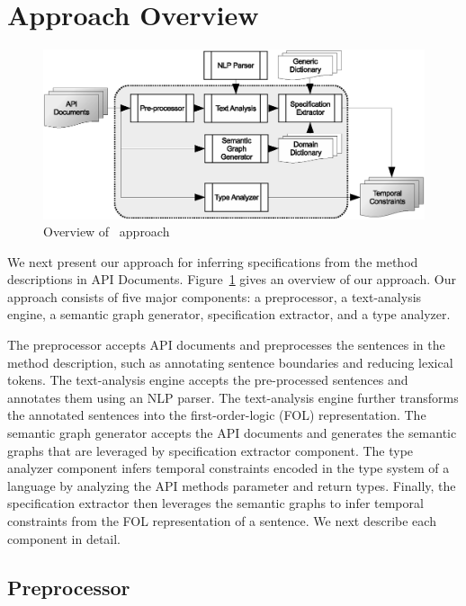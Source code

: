 \section{Approach Overview}
\label{sec:approach}

\begin{figure}
	\centering
		\includegraphics[scale=0.45]{approach.eps}
	\caption{Overview of \tool\ approach}
	\label{fig:approachOverview}
\end{figure}

We next present our approach for inferring specifications from the method descriptions in API Documents.
Figure~\ref{fig:approachOverview} gives an overview of our approach.
Our approach consists of five major components: a preprocessor, a text-analysis engine, a semantic graph generator, specification extractor, and a type analyzer.

The preprocessor accepts API documents and preprocesses the sentences in the method description, such as annotating sentence boundaries and reducing lexical tokens.
The text-analysis engine accepts the pre-processed sentences and annotates them using an NLP parser.
The text-analysis engine further transforms the annotated sentences into the first-order-logic (FOL) representation. The semantic graph generator accepts the API documents and generates the semantic graphs that are leveraged by specification extractor component.
The type analyzer component infers temporal constraints encoded in the type system of a language by analyzing the API methods parameter and return types.
Finally, the specification extractor then leverages the semantic graphs to infer temporal constraints from the FOL representation of a sentence.
We next describe each component in detail.


\subsection{Preprocessor}
\label{sub:prep}

